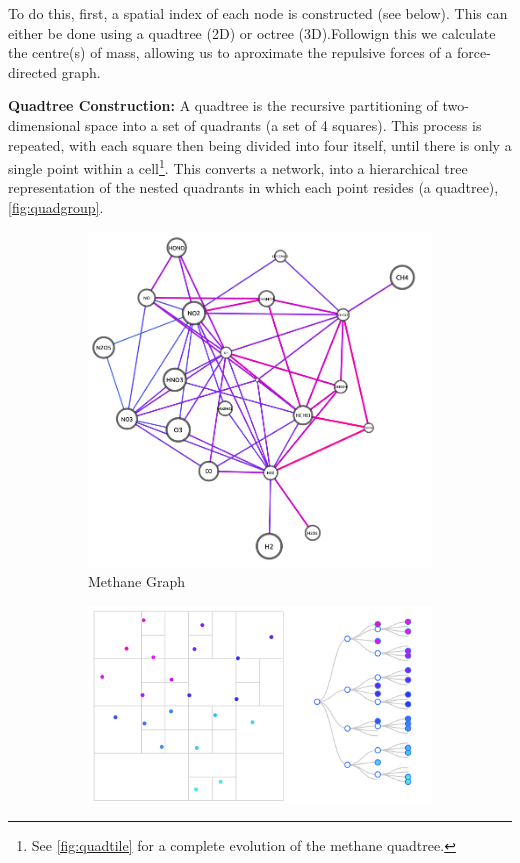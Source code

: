 To do this, first, a spatial index of each node is constructed (see below). This can either be done using a quadtree (2D) or octree (3D).Followign this we calculate the centre(s) of mass, allowing us to aproximate the repulsive forces of a force-directed graph.

\textbf{Quadtree Construction:}
A quadtree is the recursive partitioning of two-dimensional space into a set of quadrants (a set of 4 squares). This process is repeated, with each square then being divided into four itself, until there is only a single point within a cell\footnote{See \autoref{fig:quadtile} for a complete evolution of the methane quadtree.}. This converts a network, into a hierarchical tree representation of the nested quadrants in which each point resides (a quadtree), \autoref{fig:quadgroup}. 


\begin{figure}[H]
 \centering
    \begin{subfigure}[b]{.3\textwidth}
  \centering \includegraphics[width=\textwidth]{figures_c1/layout/methanequad.png}   
  \caption{Methane Graph} 
  \label{fig:quadmeth}
 \end{subfigure}
 \begin{subfigure}[b]{.6\textwidth}
  \centering \includegraphics[width=\textwidth]{figures_c1/layout/quad.png}

\end{subfigure}
\end{figure}
